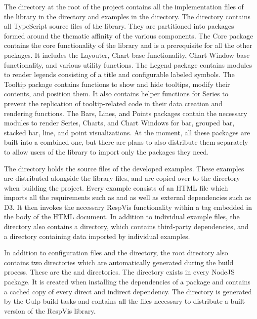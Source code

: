 The  directory at the root of the project contains all the
implementation files of the library in the  directory
and examples in the  directory. The
 directory contains all TypeScript source files of the
library. They are partitioned into packages formed around the thematic
affinity of the various components. The Core package contains the core
functionality of the library and is a prerequisite for all the other
packages. It includes the Layouter, Chart base functionality, Chart
Window base functionality, and various utility functions. The Legend
package contains modules to render legends consisting of a title and
configurable labeled symbols. The Tooltip package contains functions
to show and hide tooltips, modify their contents, and position them.
It also contains helper functions for Series to prevent the
replication of tooltip-related code in their data creation and
rendering functions. The Bars, Lines, and Points packages contain the
necessary modules to render Series, Charts, and Chart Windows for bar,
grouped bar, stacked bar, line, and point visualizations. At the
moment, all these packages are built into a combined one, but there
are plans to also distribute them separately to allow users of the
library to import only the packages they need.

The  directory holds the source files of the
developed examples. These examples are distributed alongside the
library files, and are copied over to the 
directory when building the project. Every example consists of an HTML
file which imports all the requirements such as  and
 as well as external dependencies such as D3. It
then invokes the necessary RespVis functionality within a
 tag embedded in the body of the HTML document. In
addition to individual example files, the  directory
also contains a  directory, which contains third-party
dependencies, and a  directory containing data imported by
individual examples.

In addition to configuration files and the  directory, the
root directory also contains two directories which are automatically
generated during the build process. These are the 
and  directories. The  directory
exists in every NodeJS package. It is created when installing the
dependencies of a package and contains a cached copy of every
direct and indirect dependency. The  directory is
generated by the Gulp build tasks and contains all the files necessary
to distribute a built version of the RespVis library.

